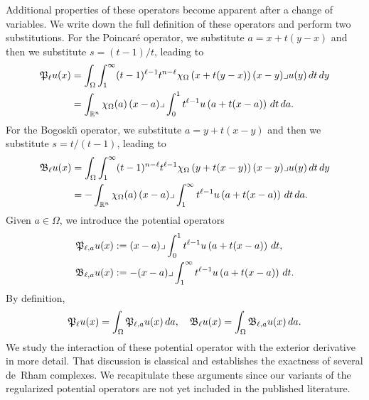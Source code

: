 \documentclass[10pt,letterpaper]{article}
\begin{document}
Additional properties of these operators become apparent after a change of variables. 
We write down the full definition of these operators and perform two substitutions.
For the Poincar\'e operator, we substitute $a = x + t(y-x)$ and then we substitute $s = (t-1)/t$,
leading to 
\begin{align*}
    {\mathfrak P}_{\ell} u(x) 
    &= 
    \int_{\Omega} \int_{1}^\infty (t-1)^{\ell-1}t^{n-\ell} 
    \chi_{\Omega}\left(x+t(y-x)\right) 
    (x-y)\lrcorner u(y) \,dt\,dy 
    \\
    &=
    \int_{{\mathbb R}^{n}} \chi_{\Omega}(a) \,(x-a)\lrcorner \int_{0}^{1} t^{\ell-1} u\left(a+t(x-a)\right)\,dt\,da
    .
\end{align*}
For the Bogoski\u{\i} operator, we substitute $a = y + t(x-y)$ and then we substitute $s = t/(t-1)$,
leading to 
\begin{align*}
    {\mathfrak B}_{\ell} u(x) 
    &= 
    \int_{\Omega} \int_{1}^\infty (t-1)^{n-\ell}t^{\ell-1} 
    \chi_{\Omega}\left(y+t(x-y)\right) 
    (x-y)\lrcorner u(y) \,dt\,dy 
    \\
    &=
    - \int_{{\mathbb R}^{n}} \chi_{\Omega}(a) \,(x-a)\lrcorner \int_{1}^\infty t^{\ell-1} u\left(a+t(x-a)\right)\,dt\,da
    .
\end{align*}
% 
Given $a \in \Omega$, we introduce the potential operators 
\begin{align*}
    {\mathfrak P}_{\ell,a} u(x) 
    &:= 
    (x-a)\lrcorner \int_{0}^{1} t^{\ell-1} u\left(a+t(x-a)\right)\,dt
    ,
    \\
    {\mathfrak B}_{\ell,a} u(x) 
    &:= 
    - (x-a)\lrcorner \int_{1}^\infty t^{\ell-1} u\left(a+t(x-a)\right)\,dt
    .
\end{align*}
By definition,
\begin{align*}
    {\mathfrak P}_{\ell} u(x) 
    =
    \int_{\Omega} {\mathfrak P}_{\ell,a} u(x) \,da,
    \quad 
    {\mathfrak B}_{\ell} u(x) 
    =
    \int_{\Omega} {\mathfrak B}_{\ell,a} u(x) \,da
    .
\end{align*}
We study the interaction of these potential operator with the exterior derivative in more detail.
% 
That discussion is classical and establishes the exactness of several de~Rham complexes. 
We recapitulate these arguments since our variants of the regularized potential operators 
are not yet included in the published literature. 
\end{document}
